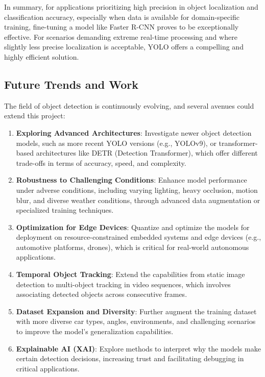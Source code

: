 \documentclass[conference]{IEEEtran}
\begin{document}
In summary, for applications prioritizing high precision in object localization and classification accuracy, especially when data is available for domain-specific training, fine-tuning a model like Faster R-CNN proves to be exceptionally effective. For scenarios demanding extreme real-time processing and where slightly less precise localization is acceptable, YOLO offers a compelling and highly efficient solution.

\subsection{Future Trends and Work}

The field of object detection is continuously evolving, and several avenues could extend this project:

\begin{enumerate}
    \item \textbf{Exploring Advanced Architectures}: Investigate newer object detection models, such as more recent YOLO versions (e.g., YOLOv9), or transformer-based architectures like DETR (Detection Transformer), which offer different trade-offs in terms of accuracy, speed, and complexity.
    \item \textbf{Robustness to Challenging Conditions}: Enhance model performance under adverse conditions, including varying lighting, heavy occlusion, motion blur, and diverse weather conditions, through advanced data augmentation or specialized training techniques.
    \item \textbf{Optimization for Edge Devices}: Quantize and optimize the models for deployment on resource-constrained embedded systems and edge devices (e.g., automotive platforms, drones), which is critical for real-world autonomous applications.
    \item \textbf{Temporal Object Tracking}: Extend the capabilities from static image detection to multi-object tracking in video sequences, which involves associating detected objects across consecutive frames.
    \item \textbf{Dataset Expansion and Diversity}: Further augment the training dataset with more diverse car types, angles, environments, and challenging scenarios to improve the model's generalization capabilities.
    \item \textbf{Explainable AI (XAI)}: Explore methods to interpret why the models make certain detection decisions, increasing trust and facilitating debugging in critical applications.
\end{enumerate}



 
  
\end{document}
